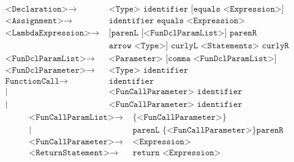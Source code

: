 \begin{align*}
	\texttt{<Declaration>}\to & \texttt{ <Type> identifier [equals <Expression>]}\\
	\texttt{<Assignment>}\to & \texttt{ identifier equals <Expression>}\\
	\texttt{<LambdaExpression>}\to & \texttt{ [parenL [<FunDclParamList>] parenR}\\
								   & \texttt{ arrow <Type>] curlyL <Statements> curlyR}\\
	\texttt{<FunDclParamList>}\to & \texttt{ <Parameter> [comma <FunDclParamList>]}\\
	\texttt{<FunDclParameter>}\to & \texttt{ <Type> identifier}\\
	\texttt{FunctionCall}\to & \texttt{ identifier}\\
	| & \texttt{ <FunCallParameter> identifier}\\
	| & \texttt{ <FunCallParameter> identifier <FunCallParamList>}
\end{align*}
\begin{align*}
\texttt{<FunCallParamList>}\to & \texttt{ \{<FunCallParameter>\}}\\
| & \texttt{ parenL \{<FunCallParameter>\} parenR}\\
\texttt{<FunCallParameter>}\to & \texttt{ <Expression>}\\
\texttt{<ReturnStatement>}\to & \texttt{ return <Expression>}
\end{align*}